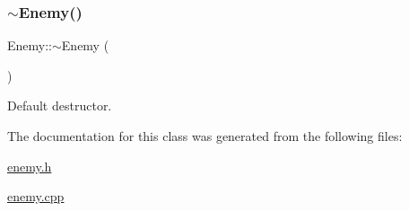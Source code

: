\subsubsection{\texorpdfstring{$\sim$\+Enemy()}{~Enemy()}}
{\footnotesize\ttfamily Enemy\+::$\sim$\+Enemy (\begin{DoxyParamCaption}{ }\end{DoxyParamCaption})\hspace{0.3cm}{\ttfamily [virtual]}}



Default destructor. 



The documentation for this class was generated from the following files\+:\begin{DoxyCompactItemize}
\item 
\hyperlink{enemy_8h}{enemy.\+h}\item 
\hyperlink{enemy_8cpp}{enemy.\+cpp}\end{DoxyCompactItemize}
